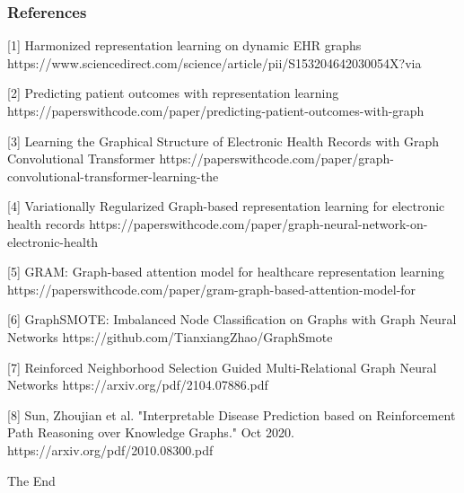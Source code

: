 \documentclass{beamer}
\begin{document}
\begin{frame}
\frametitle{References}

\scriptsize{
[1] Harmonized representation learning on dynamic EHR graphs
https://www.sciencedirect.com/science/article/pii/S153204642030054X?via%

[2] Predicting patient outcomes with representation learning
https://paperswithcode.com/paper/predicting-patient-outcomes-with-graph

[3]  Learning the Graphical Structure of Electronic Health Records with Graph Convolutional Transformer 
https://paperswithcode.com/paper/graph-convolutional-transformer-learning-the

[4] Variationally Regularized Graph-based representation learning for electronic health records
https://paperswithcode.com/paper/graph-neural-network-on-electronic-health

[5] GRAM: Graph-based attention model for healthcare representation learning
https://paperswithcode.com/paper/gram-graph-based-attention-model-for

[6] GraphSMOTE: Imbalanced Node Classification on Graphs with Graph Neural Networks
https://github.com/TianxiangZhao/GraphSmote

[7] Reinforced Neighborhood Selection Guided Multi-Relational Graph Neural Networks 
https://arxiv.org/pdf/2104.07886.pdf

[8] Sun, Zhoujian et al. "Interpretable Disease Prediction based on Reinforcement Path Reasoning over Knowledge Graphs." Oct 2020. https://arxiv.org/pdf/2010.08300.pdf}
\end{frame}


\begin{frame}
\Huge{\centerline{The End}}
\end{frame}

\end{document}
